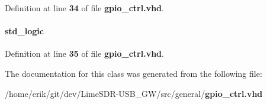 Definition at line {\bf 34} of file {\bf gpio\+\_\+ctrl.\+vhd}.

\paragraph[{gpio\+\_\+val}]{ {\bfseries \textcolor{comment}{std\+\_\+logic}\textcolor{vhdlchar}{ }} \hspace{0.3cm}{\ttfamily [Signal]}}\label{classgpio__ctrl_1_1arch_a0e8db910fa729153f774bf840c5b3d27}


Definition at line {\bf 35} of file {\bf gpio\+\_\+ctrl.\+vhd}.



The documentation for this class was generated from the following file\+:\begin{DoxyCompactItemize}
\item 
/home/erik/git/dev/\+Lime\+S\+D\+R-\/\+U\+S\+B\+\_\+\+G\+W/src/general/{\bf gpio\+\_\+ctrl.\+vhd}\end{DoxyCompactItemize}
